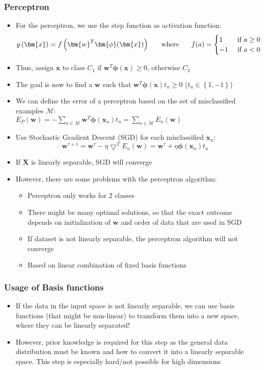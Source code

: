 \subsubsection{Perceptron}
\begin{itemize}
	\item For the perceptron, we use the step function as activation function:
	$$y\left(\bm{x}\right) = f\left(\bm{w}^T\bm{\phi}(\bm{x})\right) \text{\hspace{5mm} where \hspace{5mm}} f(a) = \begin{cases}
	1 & \text{ if } a\geq 0\\
	-1 & \text{ if } a <0
	\end{cases}$$
	\item Thus, assign $\bm{x}$ to class $C_1$ if $\bm{w}^T\bm{\phi}(\bm{x})\geq0$, otherwise $C_2$
	\item The goal is now to find a $\bm{w}$ such that $\bm{w}^T\bm{\phi}(\bm{x})t_n\geq 0$ ($t_n \in \left\{1,-1\right\}$)
	\item We can define the error of a perceptron based on the set of misclassified examples $\mathcal{M}$: \\$E_P(\bm{w})=-\sum\limits_{n\in\mathcal{M}}\bm{w}^T \bm{\phi}(\bm{x}_n)t_n = \sum\limits_{n\in\mathcal{M}}E_n(\bm{w})$
	\item Use Stochastic Gradient Descent (SGD) for each misclassified $\bm{x}_n$:\\ $$\bm{w}^{\tau+1} = \bm{w}^{\tau} - \eta \bigtriangledown^T E_n(\bm{w}) = \bm{w}^{\tau} + \eta \bm{\phi}(\bm{x}_n) t_n$$
	\item If $\bm{X}$ is linearly separable, SGD will converge
	\item However, there are some problems with the perceptron algorithm:
	\begin{itemize}
		\item Perceptron only works for 2 classes
		\item There might be many optimal solutions, so that the exact outcome depends on initialization of $\bm{w}$ and order of data that are used in SGD
		\item If dataset is not linearly separable, the perceptron algorithm will not converge
		\item Based on linear combination of fixed basis functions 
	\end{itemize}
\end{itemize}
\subsubsection{Usage of Basis functions}
\begin{itemize}
	\item If the data in the input space is not linearly separable, we can use basis functions (that might be non-linear) to transform them into a new space, where they can be linearly separated!
	\item However, prior knowledge is required for this step as the general data distribution must be known and how to convert it into a linearly separable space. This step is especially hard/not possible for high dimensions
\end{itemize}
